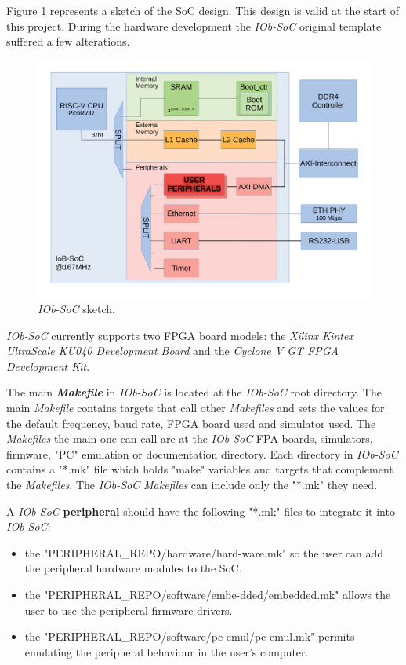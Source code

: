 Figure \ref{fig:bd_original} represents a sketch of the SoC design. This design is valid at the start of this project. During the hardware development the \textit{IOb-SoC} original template suffered a few alterations.

\begin{figure}[!ht]
  \centering
  \includegraphics[width=\linewidth]{../images/bd_original.pdf}
  \caption{\textit{IOb-SoC} sketch.}
  \label{fig:bd_original}
\end{figure}

\textit{IOb-SoC} currently supports two FPGA board models: the \textit{Xilinx Kintex UltraScale KU040 Development Board} and the \textit{Cyclone V GT FPGA Development Kit}.

The main \textbf{\textit{Makefile}} in \textit{IOb-SoC} is located at the \textit{IOb-SoC} root directory. The main \textit{Makefile} contains targets that call other \textit{Makefiles} and sets the values for the default frequency, baud rate, FPGA board used and simulator used. The \textit{Makefiles} the main one can call are at the \textit{IOb-SoC} FPA boards, simulators, firmware, "PC" emulation or documentation directory. Each directory in \textit{IOb-SoC} contains a "*.mk" file which holds "make" variables and targets that complement the \textit{Makefiles}. The \textit{IOb-SoC} \textit{Makefiles} can include only the "*.mk" they need.

A \textit{IOb-SoC} \textbf{peripheral} should have the following "*.mk" files to integrate it into \textit{IOb-SoC}:
\begin{itemize}
    \item the "PERIPHERAL\_REPO/hardware/hard-ware.mk" so the user can add the peripheral hardware modules to the SoC.
    \item the "PERIPHERAL\_REPO/software/embe-dded/embedded.mk" allows the user to use the peripheral firmware drivers.
    \item the "PERIPHERAL\_REPO/software/pc-emul/pc-emul.mk" permits emulating the peripheral behaviour in the user's computer.
\end{itemize}

